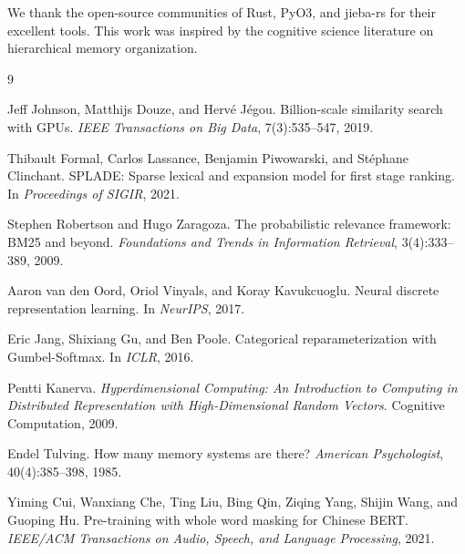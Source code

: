\documentclass[11pt,a4paper]{article}
\theoremstyle{definition}
\begin{document}
We thank the open-source communities of Rust, PyO3, and jieba-rs for their excellent tools. This work was inspired by the cognitive science literature on hierarchical memory organization.

\begin{thebibliography}{9}

Jeff Johnson, Matthijs Douze, and Herv{\'e} J{\'e}gou.
Billion-scale similarity search with {GPUs}.
\emph{IEEE Transactions on Big Data}, 7(3):535--547, 2019.

Thibault Formal, Carlos Lassance, Benjamin Piwowarski, and St{\'e}phane Clinchant.
{SPLADE}: Sparse lexical and expansion model for first stage ranking.
In \emph{Proceedings of SIGIR}, 2021.

Stephen Robertson and Hugo Zaragoza.
The probabilistic relevance framework: {BM25} and beyond.
\emph{Foundations and Trends in Information Retrieval}, 3(4):333--389, 2009.

Aaron van den Oord, Oriol Vinyals, and Koray Kavukcuoglu.
Neural discrete representation learning.
In \emph{NeurIPS}, 2017.

Eric Jang, Shixiang Gu, and Ben Poole.
Categorical reparameterization with {Gumbel-Softmax}.
In \emph{ICLR}, 2016.

Pentti Kanerva.
\emph{Hyperdimensional Computing: An Introduction to Computing in Distributed Representation with High-Dimensional Random Vectors}.
Cognitive Computation, 2009.

Endel Tulving.
How many memory systems are there?
\emph{American Psychologist}, 40(4):385--398, 1985.

Yiming Cui, Wanxiang Che, Ting Liu, Bing Qin, Ziqing Yang, Shijin Wang, and Guoping Hu.
Pre-training with whole word masking for {Chinese BERT}.
\emph{IEEE/ACM Transactions on Audio, Speech, and Language Processing}, 2021.

\end{thebibliography}
\end{document}
